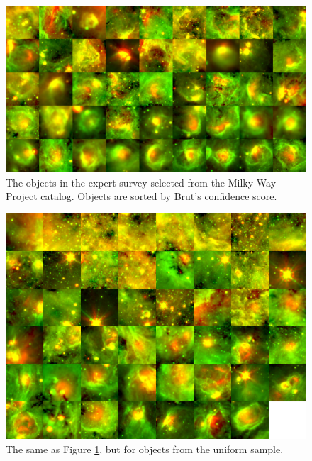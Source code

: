 {\begin{figure}
\includegraphics[width=6in]{mwp_survey_gallery}
\caption{The objects in the expert survey selected from the Milky Way Project catalog. Objects are sorted by Brut's confidence score.}
\label{fig:mwp_survey_gallery}
\end{figure}

\begin{figure}
\includegraphics[width=6in]{uniform_survey_gallery}
\caption{The same as Figure \ref{fig:mwp_survey_gallery}, but for objects from the uniform sample.}
\label{fig:uniform_survey_gallery}
\end{figure}

}
